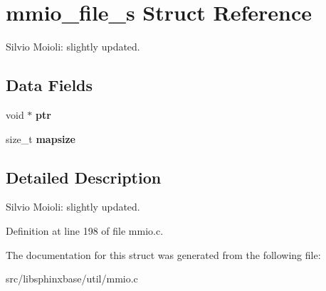 \section{mmio\_\-file\_\-s Struct Reference}
\label{structmmio__file__s}
Silvio Moioli: slightly updated.  


\subsection*{Data Fields}
\begin{CompactItemize}
\item 
void $\ast$ \textbf{ptr}\label{structmmio__file__s_e1fe8bd596a0906965970108fa849b04}

\item 
size\_\-t \textbf{mapsize}\label{structmmio__file__s_b2357ad8c44382d8ccd679801692a718}

\end{CompactItemize}


\subsection{Detailed Description}
Silvio Moioli: slightly updated. 

Definition at line 198 of file mmio.c.

The documentation for this struct was generated from the following file:\begin{CompactItemize}
\item 
src/libsphinxbase/util/mmio.c\end{CompactItemize}

